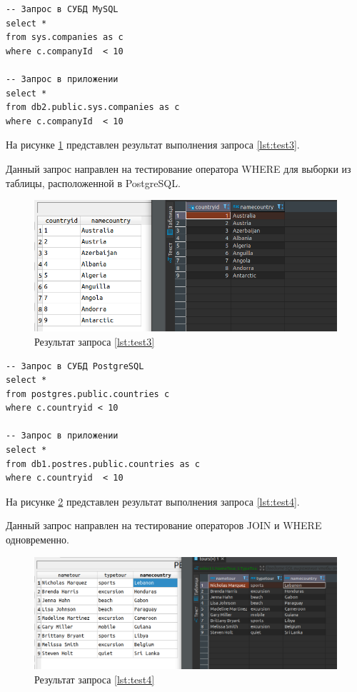 \begin{lstlisting}[label=lst:test2,caption=Запрос в MySQL и приложение]
-- Запрос в СУБД MySQL
select *
from sys.companies as c
where c.companyId  < 10

-- Запрос в приложении
select *
from db2.public.sys.companies as c
where c.companyId  < 10
\end{lstlisting}





На рисунке \ref{img:test3} представлен результат выполнения запроса \ref{lst:test3}. 

Данный запрос направлен на тестирование оператора WHERE для выборки из таблицы, расположенной в PostgreSQL.

\begin{figure}[h!]
	\begin{center}
		\includegraphics[scale=0.6]{./inc/img/test3}
		\caption{Результат запроса \ref{lst:test3}}
		\label{img:test3}
	\end{center}
\end{figure}

\begin{lstlisting}[label=lst:test3,caption=Запрос в PostgreSQL и приложение]
-- Запрос в СУБД PostgreSQL
select *
from postgres.public.countries c 
where c.countryid < 10

-- Запрос в приложении
select *
from db1.postres.public.countries as c
where c.countryid  < 10
\end{lstlisting}




На рисунке \ref{img:test4} представлен результат выполнения запроса \ref{lst:test4}. 

Данный запрос направлен на тестирование операторов JOIN и WHERE одновременно.

\begin{figure}[h!]
	\begin{center}
		\includegraphics[scale=0.6]{./inc/img/test4}
		\caption{Результат запроса \ref{lst:test4}}
		\label{img:test4}
	\end{center}
\end{figure}


